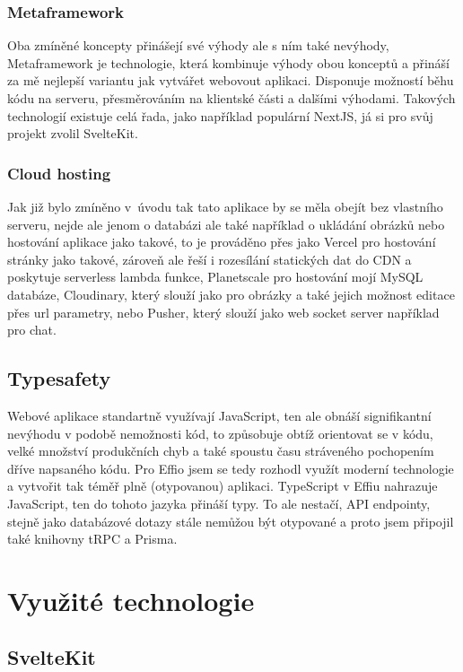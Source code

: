 \documentclass[12pt, a4paper,
openright
]{report}
\begin{document}
\subsection{Metaframework}
Oba zmíněné koncepty přinášejí své výhody ale s ním také nevýhody, Metaframework je technologie, která kombinuje výhody obou konceptů a přináší za mě nejlepší variantu jak vytvářet webovout aplikaci. Disponuje možností běhu kódu na serveru, přesměrováním na klientské části a dalšími výhodami. Takových technologií existuje celá řada, jako například populární NextJS, já si pro svůj projekt zvolil SvelteKit.

\subsection{Cloud hosting}
Jak již bylo zmíněno v~úvodu tak tato aplikace by se měla obejít bez vlastního serveru, nejde ale jenom o databázi ale také například o ukládání obrázků nebo hostování aplikace jako takové, to je prováděno přes  jako Vercel pro hostování stránky jako takové, zároveň ale řeší i rozesílání statických dat do CDN a poskytuje serverless lambda funkce, Planetscale pro hostování mojí MySQL databáze, Cloudinary, který slouží jako  pro obrázky a také jejich možnost editace přes url parametry, nebo Pusher, který slouží jako web socket server například pro chat.

\section{Typesafety}

Webové aplikace standartně využívají JavaScript, ten ale obnáší signifikantní nevýhodu v podobě nemožnosti  kód, to způsobuje obtíž orientovat se v kódu, velké množství produkčních chyb a také spoustu času stráveného pochopením dříve napsaného kódu. Pro Effio jsem se tedy rozhodl využít moderní technologie a vytvořit tak téměř plně  (otypovanou) aplikaci. TypeScript v Effiu nahrazuje JavaScript, ten do tohoto jazyka přináší typy. To ale nestačí, API endpointy, stejně jako databázové dotazy stále nemůžou být otypované a proto jsem připojil také knihovny tRPC a Prisma.


\chapter{Využité technologie}

\section{SvelteKit}
\end{document}
